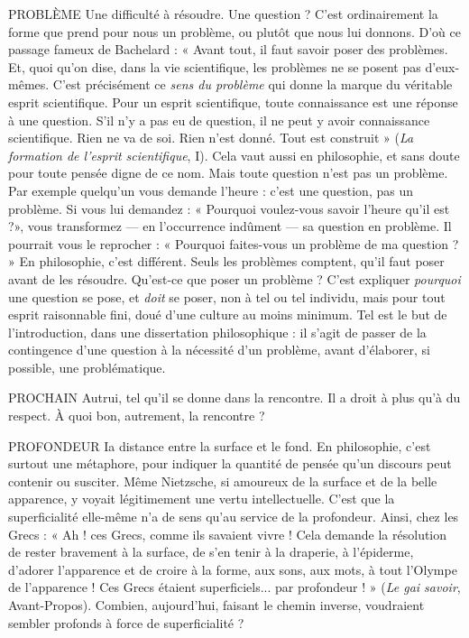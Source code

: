 PROBLÈME Une difficulté à résoudre. Une question ? C’est ordinairement
la forme que prend pour nous un problème, ou plutôt que
nous lui donnons. D’où ce passage fameux de Bachelard : « Avant tout, il faut
savoir poser des problèmes. Et, quoi qu’on dise, dans la vie scientifique, les problèmes
ne se posent pas d’eux-mêmes. C’est précisément ce {\it sens du problème}
qui donne la marque du véritable esprit scientifique. Pour un esprit scientifique,
toute connaissance est une réponse à une question. S’il n’y a pas eu de
question, il ne peut y avoir connaissance scientifique. Rien ne va de soi. Rien
n'est donné. Tout est construit » ({\it La formation de l'esprit scientifique}, I). Cela
vaut aussi en philosophie, et sans doute pour toute pensée digne de ce nom.
Mais toute question n’est pas un problème. Par exemple quelqu'un vous
demande l'heure : c’est une question, pas un problème. Si vous lui demandez :
« Pourquoi voulez-vous savoir l’heure qu’il est ?», vous transformez — en
l'occurrence indûment — sa question en problème. Il pourrait vous le
reprocher : « Pourquoi faites-vous un problème de ma question ? » En philosophie,
c’est différent. Seuls les problèmes comptent, qu’il faut poser avant de les
résoudre. Qu'est-ce que poser un problème ? C’est expliquer {\it pourquoi} une
question se pose, et {\it doit} se poser, non à tel ou tel individu, mais pour tout
esprit raisonnable fini, doué d’une culture au moins minimum. Tel est le but
de l'introduction, dans une dissertation philosophique : il s’agit de passer de la
contingence d’une question à la nécessité d’un problème, avant d’élaborer, si
possible, une problématique.

PROCHAIN  Autrui, tel qu’il se donne dans la rencontre. Il a droit à plus
qu’à du respect. À quoi bon, autrement, la rencontre ?

PROFONDEUR Ia distance entre la surface et le fond. En philosophie,
c’est surtout une métaphore, pour indiquer la quantité de
pensée qu’un discours peut contenir ou susciter. Même Nietzsche, si amoureux
de la surface et de la belle apparence, y voyait légitimement une vertu intellectuelle.
C’est que la superficialité elle-même n’a de sens qu’au service de la profondeur.
Ainsi, chez les Grecs : « Ah ! ces Grecs, comme ils savaient vivre ! Cela
demande la résolution de rester bravement à la surface, de s’en tenir à la draperie,
à l’épiderme, d’adorer l'apparence et de croire à la forme, aux sons, aux
mots, à tout l’Olympe de l'apparence ! Ces Grecs étaient superficiels... par
profondeur ! » ({\it Le gai savoir}, Avant-Propos). Combien, aujourd’hui, faisant le
chemin inverse, voudraient sembler profonds à force de superficialité ?

